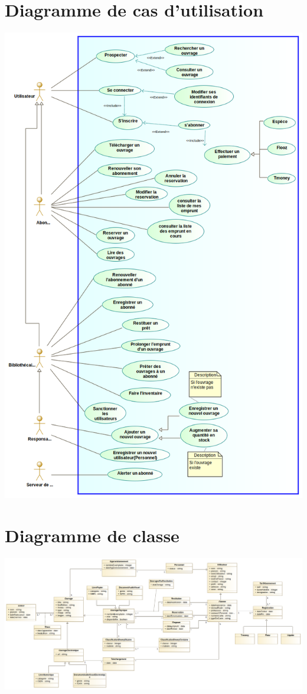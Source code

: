\documentclass[12pt,a4paper]{article}
\begin{document}
\section{Diagramme de cas d'utilisation}
\includegraphics[scale=0.5]{../../design/UseCase.png}
\section{Diagramme de classe}
\includegraphics[scale=0.3]{../../design/ClassD.png}
\end{document}
